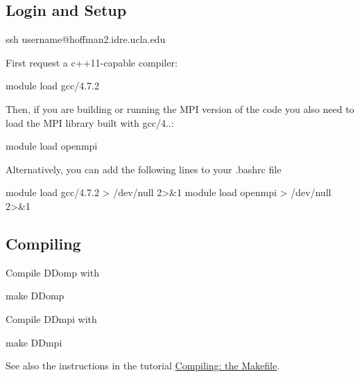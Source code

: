 \subparagraph*{}\hypertarget{hoffman2_hoffman2_login}{}\subsection{Login and Setup}\label{hoffman2_hoffman2_login}
\begin{DoxyVerb}ssh username@hoffman2.idre.ucla.edu
\end{DoxyVerb}


First request a c++11-\/capable compiler\+: \begin{DoxyVerb}module load gcc/4.7.2
\end{DoxyVerb}
 Then, if you are building or running the M\+P\+I version of the code you also need to load the M\+P\+I library built with gcc/4..\+: \begin{DoxyVerb}module load openmpi
\end{DoxyVerb}


Alternatively, you can add the following lines to your .bashrc file \begin{DoxyVerb}module load gcc/4.7.2 > /dev/null 2>&1 
module load openmpi > /dev/null 2>&1 
\end{DoxyVerb}


\subparagraph*{}\hypertarget{hoffman2_hoffma2_dd_compile}{}\subsection{Compiling}\label{hoffman2_hoffma2_dd_compile}
Compile D\+Domp with \begin{DoxyVerb}make DDomp
\end{DoxyVerb}


Compile D\+Dmpi with \begin{DoxyVerb}make DDmpi
\end{DoxyVerb}


See also the instructions in the tutorial \hyperlink{_p_i_chargedparticles_FRsource_makefile}{Compiling\+: the Makefile}.

